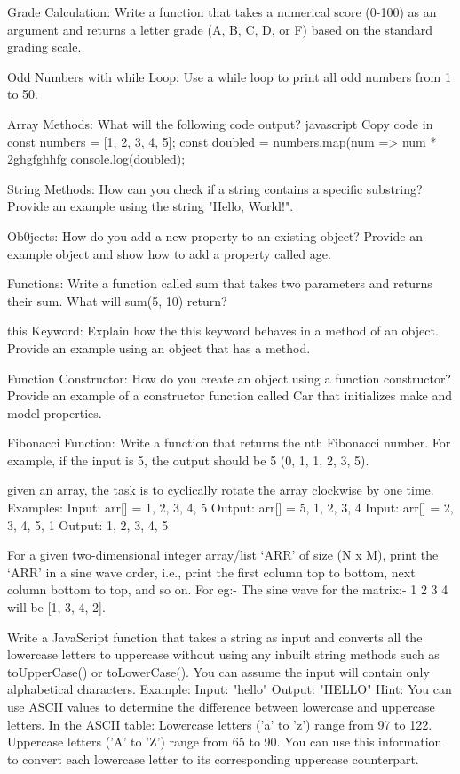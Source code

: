 Grade Calculation: Write a function that takes a numerical score (0-100) as an argument and returns a letter grade (A, B, C, D, or F) based on the standard grading scale.

Odd Numbers with while Loop: Use a while loop to print all odd numbers from 1 to 50.

Array Methods: What will the following code output?
javascript
Copy code in
const numbers = [1, 2, 3, 4, 5];
const doubled = numbers.map(num => num * 2ghgfghhfg
console.log(doubled);

String Methods: How can you check if a string contains a specific substring? Provide an example using the string "Hello, World!".

Ob0jects: How do you add a new property to an existing object? Provide an example object and show how to add a property called age.

Functions: Write a function called sum that takes two parameters and returns their sum. What will sum(5, 10) return?

this Keyword: Explain how the this keyword behaves in a method of an object. Provide an example using an object that has a method.

Function Constructor: How do you create an object using a function constructor? Provide an example of a constructor function called Car that initializes make and model properties.

Fibonacci Function: Write a function that returns the nth Fibonacci number. For example, if the input is 5, the output should be 5 (0, 1, 1, 2, 3, 5).


given an array, the task is to cyclically rotate the array clockwise by one time.
Examples:
Input: arr[] = {1, 2, 3, 4, 5}
Output: arr[] = {5, 1, 2, 3, 4}
Input: arr[] = {2, 3, 4, 5, 1}
Output: {1, 2, 3, 4, 5}


For a given two-dimensional integer array/list ‘ARR’ of size (N x M), print the ‘ARR’ in a sine wave order, i.e., print the first column top to bottom, next column bottom to top, and so on.
For eg:-
The sine wave for the matrix:-
1 2
3 4
will be [1, 3, 4, 2].



Write a JavaScript function that takes a string as input and converts all the lowercase letters to uppercase without using any inbuilt string methods such as toUpperCase() or toLowerCase(). You can assume the input will contain only alphabetical characters.
Example:
Input: "hello"
Output: "HELLO"
Hint:
You can use ASCII values to determine the difference between lowercase and uppercase letters. In the ASCII table:
Lowercase letters ('a' to 'z') range from 97 to 122.
Uppercase letters ('A' to 'Z') range from 65 to 90.
You can use this information to convert each lowercase letter to its corresponding uppercase counterpart.